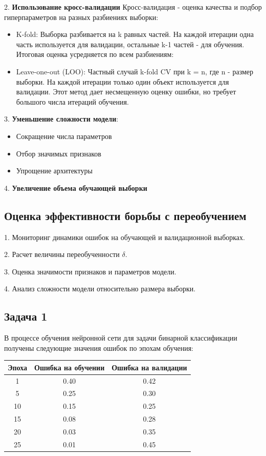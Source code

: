 2. \textbf{Использование кросс-валидации}
Кросс-валидация - оценка качества и подбор гиперпараметров на разных разбиениях выборки:
\begin{itemize}
    \item K-fold: Выборка разбивается на k равных частей. На каждой итерации одна часть используется для валидации, остальные k-1 частей - для обучения. Итоговая оценка усредняется по всем разбиениям:
    \item Leave-one-out (LOO): Частный случай k-fold CV при k = n, где n - размер выборки. На каждой итерации только один объект используется для валидации. Этот метод дает несмещенную оценку ошибки, но требует большого числа итераций обучения.
\end{itemize}

3. \textbf{Уменьшение сложности модели}:
\begin{itemize}
    \item Сокращение числа параметров
    \item Отбор значимых признаков
    \item Упрощение архитектуры
\end{itemize}

4. \textbf{Увеличение объема обучающей выборки}

\subsection*{Оценка эффективности борьбы с переобучением}

1. Мониторинг динамики ошибок на обучающей и валидационной выборках.

2. Расчет величины переобученности $\delta$.

3. Оценка значимости признаков и параметров модели.

4. Анализ сложности модели относительно размера выборки.

\subsection*{Задача 1}
В процессе обучения нейронной сети для задачи бинарной классификации получены следующие значения ошибок по эпохам обучения:

\begin{center}
    \begin{tabular}{|c|c|c|}
        \hline
        Эпоха & Ошибка на обучении & Ошибка на валидации \\
        \hline
        1     & 0.40               & 0.42                \\
        5     & 0.25               & 0.30                \\
        10    & 0.15               & 0.25                \\
        15    & 0.08               & 0.28                \\
        20    & 0.03               & 0.35                \\
        25    & 0.01               & 0.45                \\
        \hline
    \end{tabular}
\end{center}

